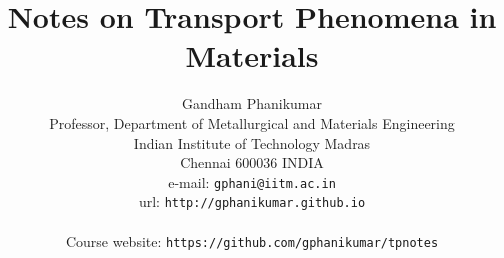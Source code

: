 \documentclass[a4paper,12pt,openany,ans]{book}
\author{Gandham Phanikumar \\
Professor, Department of Metallurgical and Materials Engineering\\
Indian Institute of Technology Madras\\
Chennai 600036 INDIA\\
{e-mail: \tt gphani@iitm.ac.in}\\
{url: \tt http://gphanikumar.github.io}\\
\vspace{1 in}\\
{Course website: \tt https://github.com/gphanikumar/tpnotes}
}
\title{Notes on Transport Phenomena in Materials}
\begin{document}



\thispagestyle{empty}



\maketitle


\tableofcontents

\listoffigures

\listoftables

\renewcommand{\listtheoremname}{List of Learning Objectives}
\listoftheorems



\newpage





























%






















\printindex
\end{document}
